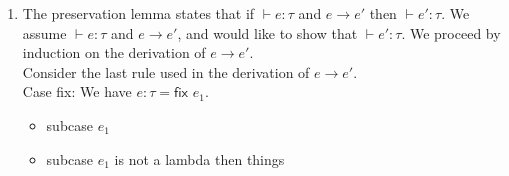 \documentclass[10pt, oneside]{article}
\begin{document}
\begin{enumerate}
\begin{enumerate}
		
		\item The preservation lemma states that if $\vdash e : \tau $ and $e \rightarrow e'$ then $\vdash e' : \tau.$ We assume $\vdash e : \tau $ and $e \rightarrow e'$, and would like to show that $\vdash e' : \tau $. We proceed by induction on the derivation of $e \rightarrow e'.$\\
		
		Consider the last rule used in the derivation of $e \rightarrow e'.$\\
		
		{\sc Case fix:} 
		We have $e:\tau = \textsf{fix } e_1.$
		\begin{itemize}
		\item {\sc subcase} $e_1$
		\item {\sc subcase} $e_1$ is not a lambda then things
		
		\end{itemize}

	\end{enumerate}
\end{enumerate}
\end{document}

